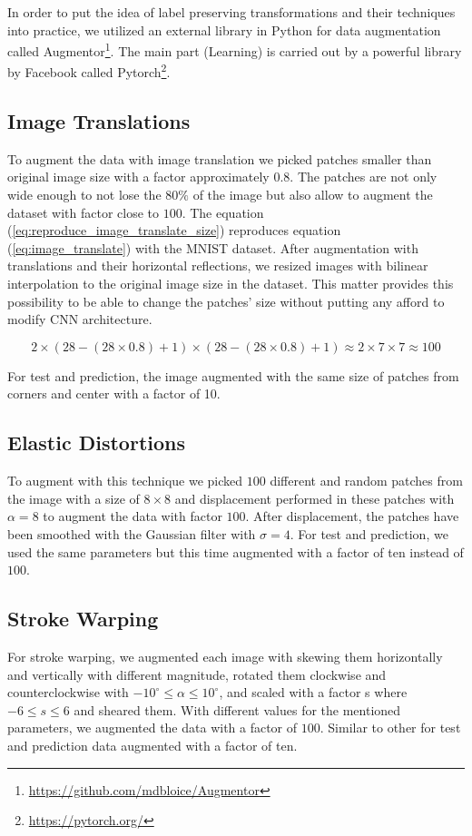 In order to put the idea of label preserving transformations and their techniques
into practice, we utilized an external library in Python for data augmentation called
Augmentor\footnote{\url{https://github.com/mdbloice/Augmentor}}. The main part (Learning) is carried
out by a powerful library by Facebook called Pytorch\footnote{\url{https://pytorch.org/}}.

\subsection{Image Translations}
To augment the data with image translation we picked patches smaller than original image size with
a factor approximately $0.8$. The patches are not only wide enough to not lose the $80\%$ of the image but
also allow to augment the dataset with factor close to $100$. The equation
(\ref{eq:reproduce_image_translate_size}) reproduces equation (\ref{eq:image_translate}) with
the MNIST dataset. After augmentation with translations and their horizontal reflections, we resized images with bilinear interpolation to the original image size in the dataset. This matter provides this possibility to be able to change the patches' size without putting any afford to modify CNN architecture.

\begin{equation}
  \label{eq:reproduce_image_translate_size}
  2\times(28-(28 \times 0.8)+1)\times(28-(28 \times 0.8)+1) \approx 2 \times 7 \times 7 \approx 100
\end{equation}

For test and prediction, the image augmented with the same size of patches from corners and center
with a factor of 10.

\subsection{Elastic Distortions}
To augment with this technique we picked $100$ different and random patches from the image with a
size of $8 \times 8$ and displacement performed in these patches with $\alpha = 8$ to augment the
data with factor $100$.  After displacement, the patches have been smoothed with the Gaussian filter
with $\sigma = 4$. For test and prediction, we used the same parameters but this time augmented with
a factor of ten instead of $100$.

\subsection{Stroke Warping}
For stroke warping, we augmented each image with skewing them horizontally and vertically with
different magnitude, rotated them clockwise and counterclockwise with $-10^{\circ} \leq \alpha \leq
  10^{\circ}$, and scaled with a factor s where $-6 \leq s \leq 6$  and sheared them. With different
values for the mentioned parameters, we augmented the data with a factor of $100$. Similar to other
for test and prediction data augmented with a factor of ten.

